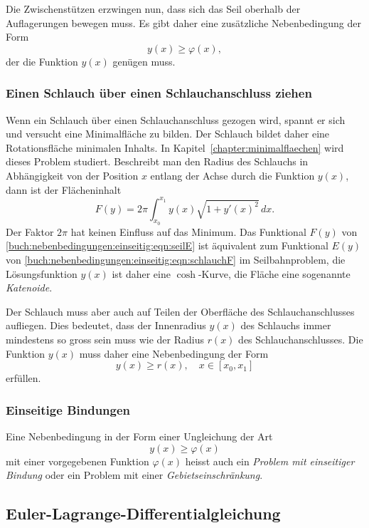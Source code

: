 Die Zwischenstützen erzwingen nun, dass sich das Seil oberhalb der 
Auflagerungen bewegen muss.
Es gibt daher eine zusätzliche Nebenbedingung der Form
\[
y(x) \ge \varphi(x),
\]
der die Funktion $y(x)$ genügen muss.

%
%
\subsubsection{Einen Schlauch über einen Schlauchanschluss ziehen}
Wenn ein Schlauch über einen Schlauchanschluss gezogen wird, spannt
er sich und versucht eine Minimalfläche zu bilden.
Der Schlauch bildet daher eine Rotationsfläche minimalen Inhalts.
In Kapitel~\ref{chapter:minimalflaechen} wird dieses Problem 
studiert.
Beschreibt man den Radius des Schlauchs in Abhängigkeit von der
Position $x$ entlang der Achse durch die Funktion $y(x)$, dann ist
der Flächeninhalt
\begin{equation}
F(y)
=
2\pi
\int_{x_0}^{x_1}
y(x)\sqrt{1+y'(x)^2}\,dx.
\label{buch:nebenbedingungen:einseitig:eqn:schlauchF}
\end{equation}
Der Faktor $2\pi$ hat keinen Einfluss auf das Minimum.
Das Funktional $F(y)$ von
\eqref{buch:nebenbedingungen:einseitig:eqn:seilE}
ist äquivalent zum Funktional $E(y)$ von
\eqref{buch:nebenbedingungen:einseitig:eqn:schlauchF}
im Seilbahnproblem,
die Lösungsfunktion $y(x)$ ist daher eine $\cosh$-Kurve,
die Fläche eine sogenannte {\em Katenoide}.

Der Schlauch muss aber auch auf Teilen der Oberfläche des
Schlauchanschlusses aufliegen.
Dies bedeutet, dass der Innenradius $y(x)$ des Schlauchs immer
mindestens so gross sein muss wie der Radius $r(x)$ des Schlauchanschlusses.
Die Funktion $y(x)$ muss daher eine Nebenbedingung der Form
\[
y(x) \ge r(x),\quad x\in[x_0,x_1]
\]
erfüllen.

%
%
\subsubsection{Einseitige Bindungen}
Eine Nebenbedingung in der Form einer Ungleichung der Art
\[
y(x) \ge \varphi(x)
\]
mit einer vorgegebenen Funktion $\varphi(x)$ heisst auch
ein {\em Problem mit einseitiger Bindung}
%
%
oder ein Problem mit einer {\em Gebietseinschränkung}.
%

%
%
\subsection{Euler-Lagrange-Differentialgleichung
\label{buch:nebenbedingungen:einseitig:subsection:eldgl}}



